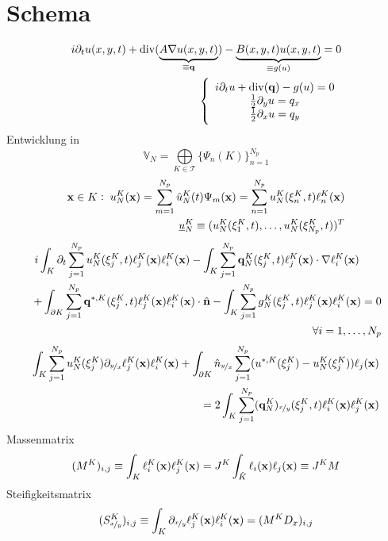 \section{Schema}
\begin{align}
  i \partial_t u(x,y,t)+\operatorname{div}(\underbrace{A\nabla u(x,y,t)}_{\equiv \vb{q}}) - \underbrace{ B(x,y,t) u(x,y,t)}_{\equiv g(u)} = 0 \\
  \left\{ \begin{array}{c}  i \partial_t u+\operatorname{div}( \vb{q}) - g(u) = 0 \\  \frac{1}{2}\partial_y u =  q_x \\ \frac{1}{2}\partial_x u =  q_y  \end{array}\right.
\end{align}
Entwicklung in
\begin{equation}
  \mathbb{V}_N = \bigoplus\limits_{K\in\mathcal{T}}^{} \{\Psi_n(K)\}_{n=1}^{N_p}
\end{equation}
\begin{align}
  \vb{x}\in K: \; u_N^K(\vb{x}) = \sum_{m=1}^{N_p}\hat{u}_N^K(t) \Psi_m(\vb{x})
  = \sum_{n=1}^{N_p} u_N^K(\vb{\xi}_n^K, t)\ell_n^K(\vb{x}) \\
  \underline{u}_N^K \equiv (u_N^K(\vb{\xi}_1^K, t),\dots, u_N^K(\vb{\xi}_{N_p}^K, t))^T
\end{align}
\begin{align*}
  i\int_K \partial_t \sum_{j=1}^{N_p} u_N^K(\vb{\xi}_j^K, t)\ell_j^K(\vb{x}) \ell_i^K(\vb{x})
  - \int_K \sum_{j=1}^{N_p} \vb{q}_N^K(\vb{\xi}_j^K, t)\ell_j^K(\vb{x}) \cdot \nabla \ell_i^K(\vb{x}) \qquad \\
  \; + \int_{\partial K} \sum_{j=1}^{N_p} \vb{q}^{*,K}(\vb{\xi}_j^K, t)\ell_j^K(\vb{x}) \ell_i^K(\vb{x}) \cdot \hat{\vb{n}}
  - \int_K \sum_{j=1}^{N_p} g_N^K(\vb{\xi}_j^K, t)\ell_j^K(\vb{x}) \ell_i^K(\vb{x}) = 0 \\
  \forall i = 1,\dots,N_p
\end{align*}
\begin{align*}
  \int_K \sum_{j=1}^{N_p} u_N^K(\vb{\xi}_j^K) \partial_{\nicefrac{y}{x}} \ell_j^K(\vb{x})\ell_i^K(\vb{x}) + \int_{\partial K} \hat{n}_{\nicefrac{y}{x}} \sum_{j=1}^{N_p} (u^{*,K}(\vb{\xi}_j^K) -     u_N^K(\vb{\xi}_j^K))\ell_j(\vb{x})\\
   = 2 \int_K \sum_{j=1}^{N_p} (\vb{q}_N^K)_{\nicefrac{x}{y}} (\vb{\xi}_j^K, t) \ell_i^K(\vb{x})\ell_j^K(\vb{x})
\end{align*}
Massenmatrix
\begin{align}
  (M^K)_{i,j} \equiv \int_K \ell_i^K(\vb{x})\ell_j^K(\vb{x}) = J^K \int_{\hat{K}}\ell_i(\vb{x}) \ell_j(\vb{x}) \equiv J^K M
\end{align}
Steifigkeitsmatrix
\begin{align}
  (S^K_{\nicefrac{x}{y}})_{i,j} \equiv \int_K \partial_{\nicefrac{x}{y}} \ell_j^K(\vb{x})\ell_i^K(\vb{x}) = (M^K D_x)_{i,j}
\end{align}

